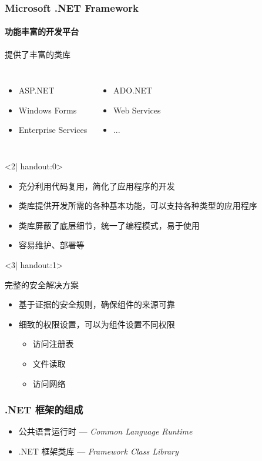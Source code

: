 \begin{frame}[t]\frametitle{Microsoft .NET Framework}
\framesubtitle{功能丰富的开发平台}
\begin{exampleblock}{提供了丰富的类库}
  \begin{columns}
    \column{4cm}
    \begin{itemize}
    \item ASP.NET
    \item Windows Forms
    \item Enterprise Services
    \end{itemize}
    \column{4cm}
    \begin{itemize}
    \item ADO.NET
    \item Web Services
    \item ...
    \end{itemize}
  \end{columns}
\end{exampleblock}
\begin{onlyenv}<2| handout:0>
  \begin{itemize}
  \item 充分利用代码复用，简化了应用程序的开发
  \item 类库提供开发所需的各种基本功能，可以支持各种类型的应用程序
  \item 类库屏蔽了底层细节，统一了编程模式，易于使用
  \item 容易维护、部署等
  \end{itemize}
\end{onlyenv}
\begin{onlyenv}<3| handout:1>
  \begin{block}{完整的安全解决方案}
    \begin{itemize}
    \item 基于证据的安全规则，确保组件的来源可靠
    \item 细致的权限设置，可以为组件设置不同权限
      \begin{itemize}
      \item 访问注册表
      \item 文件读取
      \item 访问网络
      \end{itemize}
    \end{itemize}
  \end{block}
\end{onlyenv}
\end{frame}

\begin{frame}
\frametitle{.NET 框架的组成}
\begin{itemize}
\item 公共语言运行时 --- \textit{Common Language Runtime}
\item .NET 框架类库 --- \textit{Framework Class Library}
\end{itemize}

\centering 
\end{frame}

